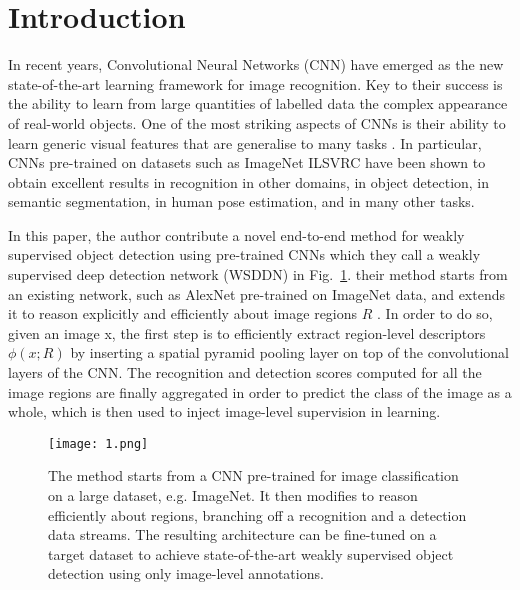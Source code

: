 \documentclass[10pt,twocolumn,letterpaper]{article}
\begin{document}
\section{Introduction}
In recent years, Convolutional Neural Networks (CNN) have emerged as the new state-of-the-art learning framework for image recognition. Key to their success is the ability to learn from large quantities of labelled data the complex appearance of real-world objects. One of the most striking aspects of CNNs is their ability to learn generic visual features that are generalise to many tasks \cite{Bilen2014Weakly}. In particular, CNNs pre-trained on datasets such as ImageNet ILSVRC have been shown to obtain excellent results in recognition in other domains, in object detection, in semantic segmentation, in human pose estimation,
and in many other tasks.
\par
In this paper, the author contribute a novel end-to-end method for weakly supervised object detection using pre-trained CNNs which they call a weakly supervised deep detection network (WSDDN) in Fig.~\ref{1}. their method starts from an existing network, such as AlexNet pre-trained on ImageNet data, and extends it to reason explicitly and efficiently about image regions $R$ \cite{Bilen2015Weakly}. In order to do so, given an image x, the first step is to efficiently extract region-level descriptors $\phi(x;R)$ by inserting a spatial pyramid pooling layer on top of the convolutional layers of the CNN. The recognition and detection scores computed for all the image regions are finally aggregated in order to predict the class of the image as a whole, which is then used to inject image-level supervision in learning.
\begin{figure}
\begin{center}
  \texttt{[image: 1.png]}\\
  \caption{The method starts from a CNN pre-trained for image classification on a large dataset, e.g. ImageNet. It then modifies to reason efficiently about regions, branching off a recognition and a detection data streams. The resulting architecture can be fine-tuned on a target dataset to achieve state-of-the-art weakly supervised object detection using only image-level annotations.}\label{1}
\end{center}
\end{figure}
\end{document}
